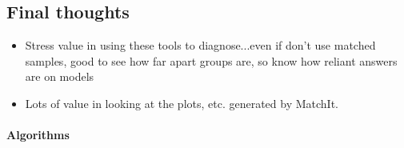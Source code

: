 \documentclass[11pt,titlepage]{article}
\begin{document}
\subsection{Final thoughts}
\begin{itemize}
\item Stress value in using these tools to diagnose...even if don't use matched samples, good to see how far apart groups are, so know how reliant
answers are on models
\item Lots of value in looking at the plots, etc. generated by MatchIt.
\end{itemize}

\paragraph{Algorithms}
\end{document}
